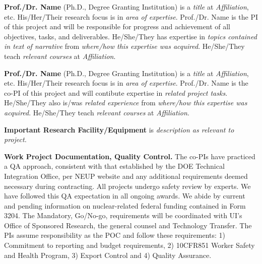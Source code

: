 \documentclass[11pt,letterpaper]{article}
\begin{document}
\noindent\textbf{Prof./Dr. Name} (Ph.D., Degree Granting Institution) is a \textit{title} at \textit{Affiliation}, etc. His/Her/Their research focus is in \textit{area of expertise}. Prof./Dr. Name is the PI of this project and will be responsible for progress and achievement of all objectives, tasks, and deliverables. He/She/They has expertise in \textit{topics contained in text of narrative} from \textit{where/how this expertise was acquired}. He/She/They teach \textit{relevant courses} at \textit{Affiliation}.

\vspace{0.5\baselineskip}

\noindent\textbf{Prof./Dr. Name} (Ph.D., Degree Granting Institution) is a \textit{title} at \textit{Affiliation}, etc. His/Her/Their research focus is in \textit{area of expertise}. Prof./Dr. Name is the co-PI of this project and will contibute expertise in \textit{related project tasks}. He/She/They also is/was \textit{related experience} from \textit{where/how this expertise was acquired}. He/She/They teach \textit{relevant courses} at \textit{Affiliation}.

\vspace{0.5\baselineskip}

\noindent\textbf{Important Research Facility/Equipment} is \textit{description as relevant to project.}

\vspace{0.5\baselineskip}

\noindent\textbf{Work Project Documentation, Quality Control.} The co-PIs have practiced a QA approach, consistent with that established by the DOE Technical Integration Office, per NEUP website and any additional requirements deemed necessary during contracting. All projects undergo safety review by experts. We have followed this QA expectation in all ongoing awards. We abide by current and pending information on nuclear-related federal funding contained in Form 3204. The Mandatory, Go/No-go, requirements will be coordinated with UI’s Office of Sponsored Research, the general counsel and Technology Transfer. The PIs assume responsibility as the POC and follow these requirements: 1) Commitment to reporting and budget requirements, 2) 10CFR851 Worker Safety and Health Program, 3) Export Control and 4) Quality Assurance.
\end{document}

